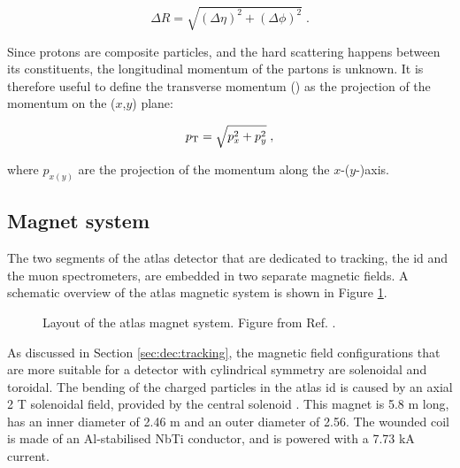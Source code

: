 \begin{equation}
\Delta R = \sqrt{ (\Delta \eta)^2 + (\Delta \phi)^2  } \; . 
\label{eq:cern:dR}
\end{equation}

Since protons are composite particles, and the hard scattering happens between its constituents, the longitudinal momentum of the partons is unknown. It is therefore useful to define the transverse momentum (\pt) as the projection of the momentum on the ($x$,$y$) plane: 

\begin{equation}
p_{\rm T} = \sqrt{p_x^2 + p_y^2} \; , \nonumber
\label{eq:cern:pt}
\end{equation}

\noindent where $p_{x(y)}$ are the projection of the momentum along the $x$-($y$-)axis.



\subsection{Magnet system}
\label{sec:atlas:magnets}

The two segments of the \gls{atlas} detector that are dedicated to tracking, the \gls{id} and the muon spectrometers, are embedded in two separate magnetic fields. A schematic overview of the \gls{atlas} magnetic system is shown in Figure \ref{fig:atlas:magnet}.
\label{sec:cern:atlasmagnets}
\begin{figure}[ht]
\centering
{}
\caption{Layout of the \gls{atlas} magnet system. Figure from Ref. \cite{Goodson}.}
\label{fig:atlas:magnet}
\end{figure}

As discussed in Section \ref{sec:dec:tracking}, the magnetic field configurations that are more suitable for a detector with cylindrical symmetry are solenoidal and toroidal. The bending of the charged particles in the \gls{atlas} \gls{id} is caused by an axial 2 T solenoidal field, provided by the central solenoid \cite{YAMAMOTO200853}. This magnet is 5.8 m long, has an inner diameter of 2.46 m and an outer diameter of 2.56. The wounded coil is made of an Al-stabilised NbTi conductor, and is powered with a 7.73 kA current. 


